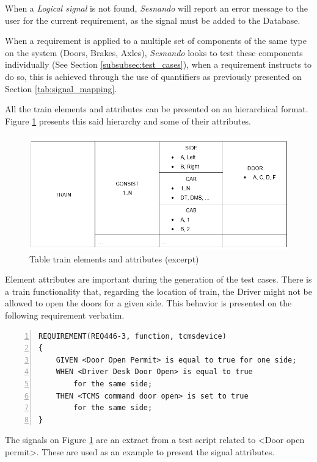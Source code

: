 When a \textit{Logical signal} is not found, \textit{Sesnando} will report an error message to the user for the current requirement, as the signal must be added to the Database.

When a requirement is applied to a multiple set of components of the same type on the system (Doors, Brakes, Axles), \textit{Sesnando} looks to test these components individually (See Section \ref{subsubsec:test_cases}), when a requirement instructs to do so, this is achieved through the use of quantifiers as previously presented on Section \ref{tab:signal_mapping}.

All the train elements and attributes can be presented on an hierarchical format. Figure \ref{fig:hier_elem_attr} presents this said hierarchy and some of their attributes.

\begin{figure}[h]
    \centering
    \includegraphics[width=\textwidth]{images/hier_elems_attrs.PNG}
    \caption{Table train elements and attributes (excerpt)}
    \label{fig:hier_elem_attr}
\end{figure}

Element attributes are important during the generation of the test cases. There is a train functionality that, regarding the location of train, the Driver might not be allowed to open the doors for a given side. This behavior is presented on the following requirement verbatim.


\begin{Verbatim}[xleftmargin=12mm, numbers=left]
REQUIREMENT(REQ446-3, function, tcmsdevice) 
{
	GIVEN <Door Open Permit> is equal to true for one side;
	WHEN <Driver Desk Door Open> is equal to true 
	    for the same side;
	THEN <TCMS command door open> is set to true 
	    for the same side;
}
\end{Verbatim}

The signals on Figure \ref{fig:hier_elem_attr} are an extract from a test script related to <Door open permit>. These are used as an example to present the signal attributes.

